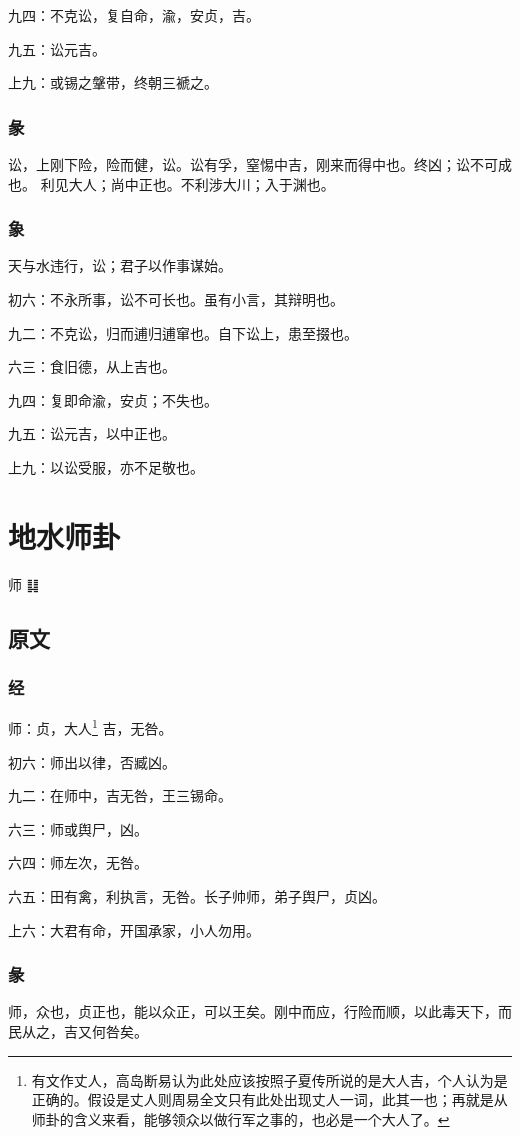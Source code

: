 \documentclass[12pt,oneside]{book}
\begin{document}
九四：不克讼，复自命，渝，安贞，吉。

九五：讼元吉。

上九：或锡之鞶带，终朝三褫之。

\subsection{彖}
讼，上刚下险，险而健，讼。讼有孚，窒惕中吉，刚来而得中也。终凶；讼不可成也。 利见大人；尚中正也。不利涉大川；入于渊也。

\subsection{象}
天与水违行，讼；君子以作事谋始。

初六：不永所事，讼不可长也。虽有小言，其辩明也。

九二：不克讼，归而逋归逋窜也。自下讼上，患至掇也。

六三：食旧德，从上吉也。

九四：复即命渝，安贞；不失也。

九五：讼元吉，以中正也。

上九：以讼受服，亦不足敬也。

\chapter{地水师卦}
师 {\Large ䷆}

\section{原文}
\subsection{经}
师：贞，大人\footnote{有文作丈人，高岛断易认为此处应该按照子夏传所说的是大人吉，个人认为是正确的。假设是丈人则周易全文只有此处出现丈人一词，此其一也；再就是从师卦的含义来看，能够领众以做行军之事的，也必是一个大人了。} 吉，无咎。

初六：师出以律，否臧凶。

九二：在师中，吉无咎，王三锡命。

六三：师或舆尸，凶。

六四：师左次，无咎。

六五：田有禽，利执言，无咎。长子帅师，弟子舆尸，贞凶。

上六：大君有命，开国承家，小人勿用。

\subsection{彖}
师，众也，贞正也，能以众正，可以王矣。刚中而应，行险而顺，以此毒天下，而民从之，吉又何咎矣。
\end{document}
